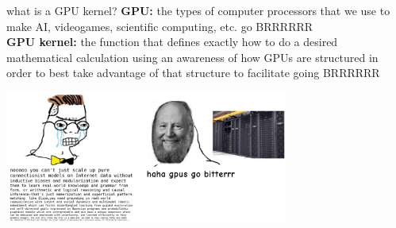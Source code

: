 \documentclass[aspectratio=169]{beamer}
\begin{document}
\begin{frame}{what is a GPU kernel?}
\textbf{GPU:} the types of computer processors that we use to make AI, videogames, scientific computing, etc. go BRRRRRR \\
\textbf{GPU kernel:} the function that defines exactly how to do a desired mathematical calculation using an awareness of how GPUs are structured in order to best take advantage of that structure to facilitate going BRRRRRR
\begin{center}
    \includegraphics[width=0.7\textwidth]{pics/gpus_go_brrr-2460456025.png}    
\end{center}
\end{frame}
\end{document}
